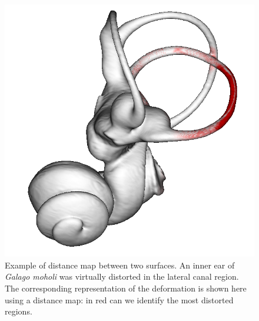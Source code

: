 \begin{figure}
  \centering
  \includegraphics[scale=0.28]{images/11/distance_between_example.png} 
	\caption{
Example of distance map between two surfaces. An inner ear of \textit{Galago moholi} was virtually distorted in the lateral canal region. The corresponding representation of the deformation is shown here using a distance map: in red can we identify the most distorted regions.}
\label{distance_between_example}
 
\end{figure}



